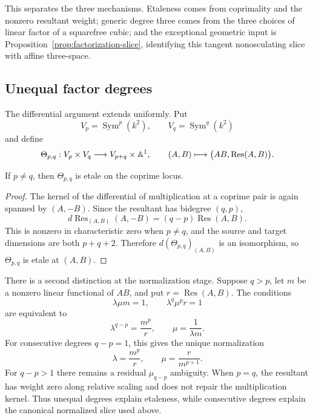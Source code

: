 This separates the three mechanisms.  Etaleness comes from coprimality and
the nonzero resultant weight; generic degree three comes from the three
choices of linear factor of a squarefree cubic; and the exceptional geometric
input is Proposition~\ref{prop:factorization-slice}, identifying this tangent
nonosculating slice with affine three-space.

\subsection{Unequal factor degrees}

The differential argument extends uniformly.  Put
\[
 V_p=\operatorname{Sym}^p(k^2),
 \qquad
 V_q=\operatorname{Sym}^q(k^2)
\]
and define
\[
 \Theta_{p,q}:V_p\times V_q\longrightarrow V_{p+q}\times\mathbb A^1,
 \qquad
 (A,B)\longmapsto\bigl(AB,\operatorname{Res}(A,B)\bigr).
\]

\begin{proposition}
If $p\ne q$, then $\Theta_{p,q}$ is etale on the coprime locus.
\end{proposition}

\begin{proof}
The kernel of the differential of multiplication at a coprime pair is again
spanned by $(A,-B)$.  Since the resultant has bidegree $(q,p)$,
\[
 d\operatorname{Res}_{(A,B)}(A,-B)
 =(q-p)\operatorname{Res}(A,B).
\]
This is nonzero in characteristic zero when $p\ne q$, and the source and
target dimensions are both $p+q+2$.  Therefore
$d(\Theta_{p,q})_{(A,B)}$ is an isomorphism, so $\Theta_{p,q}$ is etale at
$(A,B)$.
\end{proof}

There is a second distinction at the normalization stage.  Suppose $q>p$,
let $m$ be a nonzero linear functional of $AB$, and put
$r=\operatorname{Res}(A,B)$.  The conditions
\[
 \lambda\mu m=1,
 \qquad
 \lambda^q\mu^p r=1
\]
are equivalent to
\[
 \lambda^{q-p}=\frac{m^p}{r},
 \qquad
 \mu=\frac1{\lambda m}.
\]
For consecutive degrees $q-p=1$, this gives the unique normalization
\[
 \lambda=\frac{m^p}{r},
 \qquad
 \mu=\frac{r}{m^{p+1}}.
\]
For $q-p>1$ there remains a residual $\mu_{q-p}$ ambiguity.  When $p=q$, the
resultant has weight zero along relative scaling and does not repair the
multiplication kernel.  Thus unequal degrees explain etaleness, while
consecutive degrees explain the canonical normalized slice used above.
